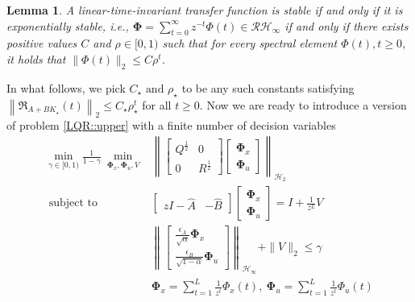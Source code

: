 \documentclass{article}[12pt]
\newtheorem{lemma}{Lemma}
\begin{document}
\begin{lemma}
A linear-time-invariant transfer function is stable if and only if it is exponentially stable, i.e., $\mathbf{\Phi}=\sum_{t=0}^{\infty} z^{-t} \Phi(t) \in \mathcal{R} \mathcal{H}_{\infty}$ if and only if there exists positive values $C$ and $\rho \in[0,1)$ such that for every spectral element $\Phi(t), t \geq 0$, it holds that $\|\Phi(t)\|_{2} \leq C \rho^{t}$.
\end{lemma}
\noindent In what follows, we pick $C_{\star} \text { and } \rho_{\star}$ to be any such constants satisfying $\left\|\mathfrak{R}_{A+B K_{\star}}(t)\right\|_{2} \leq C_{\star} \rho_{\star}^{t}$ for all $t \geq 0$.
Now we are ready to introduce a version of problem \eqref{LQR::upper} with a finite number of decision variables
\begin{equation}
\label{LQR::upper_finite}
\begin{array}{ll}{\operatorname{min}_{\gamma \in {[0,1)}} \frac{1}{1-\gamma} \ \min _{\mathbf{\Phi}_x,\mathbf{\Phi}_u,V} } & {\left\|\left[\begin{array}{cc}{Q^{\frac{1}{2}}} & {0} \\ {0} & {R^{\frac{1}{2}}}\end{array}\right]\left[\begin{array}{l}{\mathbf{\Phi}_{x}} \\ {\mathbf{\Phi}_{u}}\end{array}\right]\right\|_{\mathcal{H}_{2}}}
\\ 
{\text { subject to }} & {\left[\begin{array}{cc}{z I-\widehat{A}} & {-\widehat{B}}\end{array}\right]\left[\begin{array}{c}{\mathbf{\Phi}_{x}} \\ {\mathbf{\Phi}_{u}}\end{array}\right]=I+\frac{1}{z^{L}} V} \\ &\left\|\left[\begin{array}{c}{\frac{\epsilon_{A}}{\sqrt{\alpha}} \mathbf{\Phi}_{x}} \\ {\frac{\epsilon_{B}}{\sqrt{1-\alpha}} \mathbf{\Phi}_{u}}\end{array}\right]\right\|_{\mathcal{H}_{\infty}} +\|V\|_{2} \leq \gamma \\
& \mathbf{\Phi}_{x}=\sum_{t=1}^{L} \frac{1}{z^{t}} \Phi_{x}(t), \ \mathbf{\Phi}_{u}=\sum_{t=1}^{L} \frac{1}{z^{t}} \Phi_{u}(t)
\end{array}
\end{equation}
\end{document}
